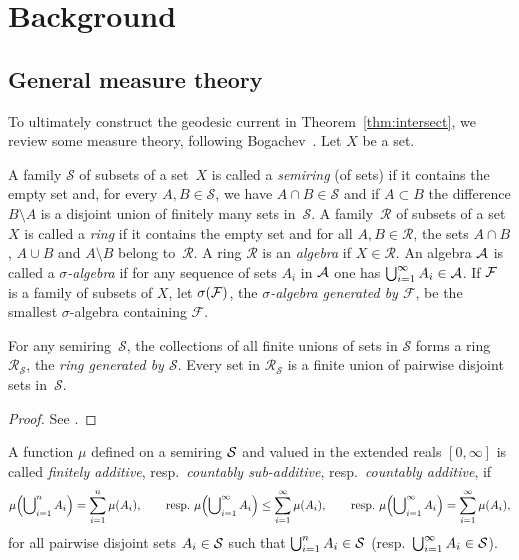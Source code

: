 \section{Background}
\label{sec:backround}

\subsection{General measure theory}
\label{subsec:backround}

To ultimately construct the geodesic current in
Theorem~\ref{thm:intersect}, we review some measure theory, following
Bogachev~\cite{Bo07:MeasureTheory}.
Let $X$ be a set.

\begin{definition}
  A family $\mathcal{S}$ of subsets of a set~$X$ is called a
  \emph{semiring} (of sets) if it contains the empty set and, for
  every $A,B \in \mathcal{S}$, we have
  $A \cap B \in \mathcal{S}$ and if $A \subset B$ the difference
  $B \setminus A$ is a disjoint union of finitely many sets
  in~$\mathcal{S}$. A family~$\mathcal{R}$ of subsets of a set $X$ is
  called a \emph{ring} if it contains the empty set and for all
  $A,B \in \mathcal{R}$, the sets $A \cap B$, $A \cup B$ and
  $A \setminus B$ belong to~$\mathcal{R}$.  A ring $\mathcal{R}$ is an \emph{algebra} if $X \in \mathcal{R}$. An algebra $\mathcal{A}$ is called a \emph{$\sigma$-algebra} if for any sequence of sets $A_i$ in $\mathcal{A}$ one has $\bigcup_{i=1}^{\infty} A_i \in \mathcal{A}$.
If $\mathcal{F}$ is a family of subsets of $X$, let $\sigma(\mathcal{F})$, the \emph{$\sigma$-algebra generated by $\mathcal{F}$}, be the smallest $\sigma$-algebra containing $\mathcal{F}$.
  \label{def:semiring}
\end{definition}

\begin{lemma}
  For any semiring~$\mathcal{S}$, the collections of all finite unions
  of sets in $\mathcal{S}$ forms a ring $\mathcal{R}_{\mathcal{S}}$,
  the \emph{ring generated by $\mathcal{S}$}. Every set in
  $\mathcal{R}_{\mathcal{S}}$ is a finite union of pairwise disjoint
  sets in~$\mathcal{S}$.
\end{lemma}
\begin{proof}
See \cite[1.2.14~Lemma]{Bo07:MeasureTheory}.
\end{proof}

\begin{definition}

A function $\mu$ defined on a semiring $\mathcal{S}$ and valued in the
extended reals $[0,\infty]$ is called
\emph{finitely additive}, resp.\ \emph{countably sub-additive}, resp.\
\emph{countably additive}, if
\[
\mu\Bigl(\bigcup\nolimits_{i=1}^n A_i \Bigr) = \sum_{i=1}^n \mu(A_i),\qquad
\text{resp.\ }\mu\Bigl(\bigcup\nolimits_{i=1}^\infty A_i \Bigr) \le \sum_{i=1}^\infty \mu(A_i),\qquad
\text{resp.\ }\mu\Bigl(\bigcup\nolimits_{i=1}^\infty A_i \Bigr) = \sum_{i=1}^\infty \mu(A_i),
\]
for all pairwise
disjoint sets $A_i \in \mathcal{S}$
such that $\bigcup_{i=1}^{n}
A_i \in \mathcal{S}$ (resp.\ $\bigcup_{i=1}^{\infty}
A_i \in \mathcal{S}$).
\end{definition}

